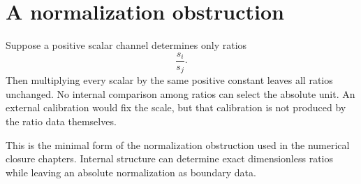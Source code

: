 \section{A normalization obstruction}
\label{app:example-normalization}
Suppose a positive scalar channel determines only ratios
\[
	\frac{s_i}{s_j}.
\]
Then multiplying every scalar by the same positive constant leaves all
ratios unchanged.  No internal comparison among ratios can select the
absolute unit.  An external calibration would fix the scale, but that
calibration is not produced by the ratio data themselves.

This is the minimal form of the normalization obstruction used in the
numerical closure chapters.  Internal structure can determine exact
dimensionless ratios while leaving an absolute normalization as boundary
data.

\begin{chapterclosing}
\end{chapterclosing}
